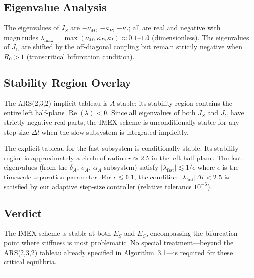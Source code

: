 \documentclass[10pt]{article}
\begin{document}
\subsection{Eigenvalue Analysis}

The eigenvalues of $J_S$ are $-\nu_M$, $-\kappa_P$, $-\kappa_I$; all are
real and negative with magnitudes $\lambda_{\max} = \max(\nu_M, \kappa_P,
\kappa_I) \approx 0.1\text{--}1.0$ (dimensionless). The eigenvalues of
$J_C$ are shifted by the off-diagonal coupling but remain strictly
negative when $R_0 > 1$ (transcritical bifurcation condition).

\subsection{Stability Region Overlay}

The ARS(2,3,2) implicit tableau is $A$-stable: its stability region
contains the entire left half-plane $\operatorname{Re}(\lambda) < 0$.
Since all eigenvalues of both $J_S$ and $J_C$ have strictly negative
real parts, the IMEX scheme is unconditionally stable for any step size
$\Delta t$ when the slow subsystem is integrated implicitly.

The explicit tableau for the fast subsystem is conditionally stable.
Its stability region is approximately a circle of radius $r \approx
2.5$ in the left half-plane. The fast eigenvalues (from the
$\delta_A$, $\sigma_A$, $\alpha_A$ subsystem) satisfy
$|\lambda_{\text{fast}}| \lesssim 1/\epsilon$ where $\epsilon$ is
the timescale separation parameter. For $\epsilon \lesssim 0.1$,
the condition $|\lambda_{\text{fast}}|\Delta t < 2.5$ is satisfied
by our adaptive step-size controller (relative tolerance $10^{-6}$).

\subsection{Verdict}

The IMEX scheme is stable at both $E_S$ and $E_C$, encompassing the
bifurcation point where stiffness is most problematic.
No special treatment---beyond the ARS(2,3,2) tableau already specified
in Algorithm~3.1---is required for these critical equilibria.

\noindent\rule{\linewidth}{0.4pt}

\clearpage
\end{document}
